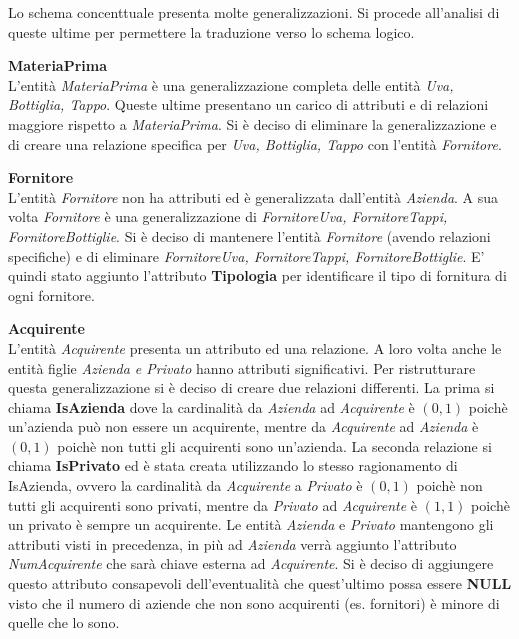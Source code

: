Lo schema concenttuale presenta molte generalizzazioni. Si procede all'analisi di queste ultime per permettere la traduzione verso lo schema logico.
\begin{flushleft}
	\textbf{\large{MateriaPrima}}\\
	L'entità \emph{MateriaPrima} è una generalizzazione completa delle entità \emph{Uva, Bottiglia, Tappo}. Queste ultime presentano un carico di attributi e di relazioni maggiore rispetto a \emph{MateriaPrima}. Si è deciso di eliminare la generalizzazione e di creare una relazione specifica per \emph{Uva, Bottiglia, Tappo} con l'entità \emph{Fornitore}.
\end{flushleft}

\begin{flushleft}
	\textbf{\large{Fornitore}}\\
	L'entità \emph{Fornitore} non ha attributi ed è generalizzata dall'entità \emph{Azienda}. A sua volta \emph{Fornitore} è una generalizzazione di \emph{FornitoreUva, FornitoreTappi, FornitoreBottiglie}. Si è deciso di mantenere l'entità \emph{Fornitore} (avendo relazioni specifiche) e di eliminare \emph{FornitoreUva, FornitoreTappi, FornitoreBottiglie}. E' quindi stato aggiunto l'attributo \textbf{Tipologia} per identificare il tipo di fornitura di ogni fornitore.
\end{flushleft}


\begin{flushleft}
	\textbf{\large{Acquirente}}\\
	L'entità \emph{Acquirente} presenta un attributo ed una relazione. A loro volta anche le entità figlie \emph{Azienda e Privato} hanno attributi significativi. Per ristrutturare questa generalizzazione si è deciso di creare due relazioni differenti. La prima si chiama \textbf{IsAzienda} dove la cardinalità da \emph{Azienda} ad \emph{Acquirente} è $(0,1)$ poichè un'azienda può non essere un acquirente, mentre da \emph{Acquirente} ad \emph{Azienda} è $(0,1)$ poichè non tutti gli acquirenti sono un'azienda.
	La seconda relazione si chiama \textbf{IsPrivato} ed è stata creata utilizzando lo stesso ragionamento di IsAzienda, ovvero la cardinalità da \emph{Acquirente} a \emph{Privato} è $(0,1)$ poichè non tutti gli acquirenti sono privati, mentre da \emph{Privato} ad \emph{Acquirente} è $(1,1)$ poichè un privato è sempre un acquirente. Le entità \emph{Azienda} e \emph{Privato} mantengono gli attributi visti in precedenza, in più ad \emph{Azienda} verrà aggiunto l'attributo \emph{NumAcquirente} che sarà chiave esterna ad \emph{Acquirente}. Si è deciso di aggiungere questo attributo consapevoli dell'eventualità che quest'ultimo possa essere \textbf{NULL} visto che il numero di aziende che non sono acquirenti (es. fornitori) è minore di quelle che lo sono.
\end{flushleft}

